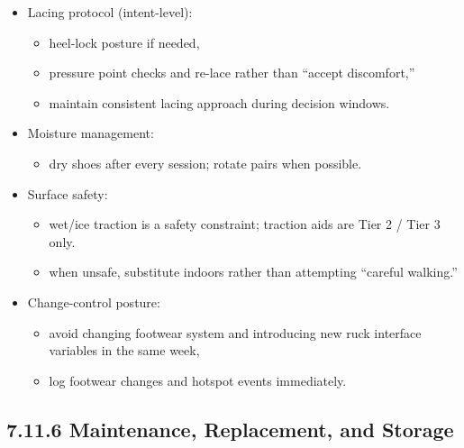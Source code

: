 \documentclass[10pt]{article}
\begin{document}
\begin{itemize}
\item Lacing protocol (intent-level):
  \begin{itemize}
  \item heel-lock posture if needed,
  \item pressure point checks and re-lace rather than “accept discomfort,”
  \item maintain consistent lacing approach during decision windows.
  \end{itemize}
\item Moisture management:
  \begin{itemize}
  \item dry shoes after every session; rotate pairs when possible.
  \end{itemize}
\item Surface safety:
  \begin{itemize}
  \item wet/ice traction is a safety constraint; traction aids are Tier 2 / Tier 3 only.
  \item when unsafe, substitute indoors rather than attempting “careful walking.”
  \end{itemize}
\item Change-control posture:
  \begin{itemize}
  \item avoid changing footwear system and introducing new ruck interface variables in the same week,
  \item log footwear changes and hotspot events immediately.
  \end{itemize}
\end{itemize}

\subsection*{7.11.6 Maintenance, Replacement, and Storage}
{}
\end{document}
